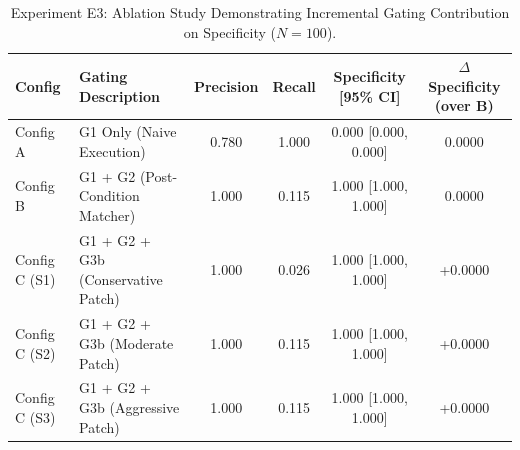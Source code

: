\begin{table}[t]
\centering
\caption{Experiment E3: Ablation Study Demonstrating Incremental Gating Contribution on Specificity ($N=100$).}
\label{tab:e3_ablation}
\small
\begin{tabular}{llcccc}
\hline
\textbf{Config} & \textbf{Gating Description} & \textbf{Precision} & \textbf{Recall} & \textbf{Specificity [95\% CI]} & \textbf{$\Delta$ Specificity (over B)} \\
\hline
Config A & G1 Only (Naive Execution) & 0.780 & 1.000 & 0.000 [0.000, 0.000] & 0.0000 \\
Config B & G1 + G2 (Post-Condition Matcher) & 1.000 & 0.115 & 1.000 [1.000, 1.000] & 0.0000 \\
Config C (S1) & G1 + G2 + G3b (Conservative Patch) & 1.000 & 0.026 & 1.000 [1.000, 1.000] & +0.0000 \\
Config C (S2) & G1 + G2 + G3b (Moderate Patch) & 1.000 & 0.115 & 1.000 [1.000, 1.000] & +0.0000 \\
Config C (S3) & G1 + G2 + G3b (Aggressive Patch) & 1.000 & 0.115 & 1.000 [1.000, 1.000] & +0.0000 \\
\hline
\end{tabular}
\end{table}
